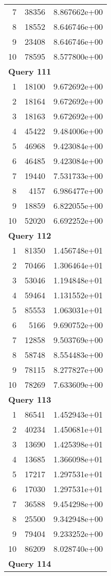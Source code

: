 \begin{longtable}[{p}]{@{}rrp{}@{}}
7 & 38356 & 8.867662e+00 \\
8 & 18552 & 8.646746e+00 \\
9 & 23408 & 8.646746e+00 \\
10 & 78595 & 8.577800e+00 \\
\midrule
\multicolumn{3}{l}{\bfseries Query 111} \\
1 & 18100 & 9.672692e+00 \\
2 & 18164 & 9.672692e+00 \\
3 & 18163 & 9.672692e+00 \\
4 & 45422 & 9.484006e+00 \\
5 & 46968 & 9.423084e+00 \\
6 & 46485 & 9.423084e+00 \\
7 & 19440 & 7.531733e+00 \\
8 & 4157 & 6.986477e+00 \\
9 & 18859 & 6.822055e+00 \\
10 & 52020 & 6.692252e+00 \\
\midrule
\multicolumn{3}{l}{\bfseries Query 112} \\
1 & 81350 & 1.456748e+01 \\
2 & 70466 & 1.306464e+01 \\
3 & 53046 & 1.194848e+01 \\
4 & 59464 & 1.131552e+01 \\
5 & 85553 & 1.063031e+01 \\
6 & 5166 & 9.690752e+00 \\
7 & 12858 & 9.503769e+00 \\
8 & 58748 & 8.554483e+00 \\
9 & 78115 & 8.277827e+00 \\
10 & 78269 & 7.633609e+00 \\
\midrule
\multicolumn{3}{l}{\bfseries Query 113} \\
1 & 86541 & 1.452943e+01 \\
2 & 40234 & 1.450681e+01 \\
3 & 13690 & 1.425398e+01 \\
4 & 13685 & 1.366098e+01 \\
5 & 17217 & 1.297531e+01 \\
6 & 17030 & 1.297531e+01 \\
7 & 36588 & 9.454298e+00 \\
8 & 25500 & 9.342948e+00 \\
9 & 79404 & 9.233252e+00 \\
10 & 86209 & 8.028740e+00 \\
\midrule
\multicolumn{3}{l}{\bfseries Query 114} \\

\end{longtable}
